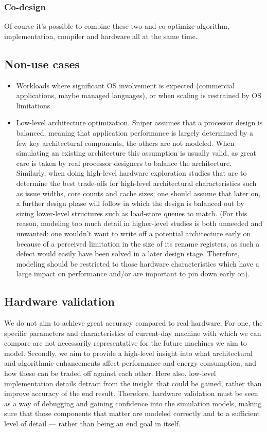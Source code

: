 \documentclass[a4paper,11pt,titlepage]{article}
\begin{document}
{\subsubsection{Co-design}

Of course it's possible to combine these two and co-optimize algorithm, implementation, compiler and hardware all at the same time.


\subsection{Non-use cases}

\begin{itemize}
\item Workloads where significant OS involvement is expected (commercial applications,
      maybe managed languages), or when scaling is restrained by OS limitations
\item Low-level architecture optimization. Sniper assumes that a processor design is balanced, meaning that application performance is largely determined by a few key architectural components, the others are not modeled. When simulating an existing architecture this assumption is usually valid, as great care is taken by real processor designers to balance the architecture. Similarly, when doing high-level hardware exploration studies that are to determine the best trade-offs for high-level architectural characteristics such as issue widths, core counts and cache sizes; one should assume that later on, a further design phase will follow in which the design is balanced out by sizing lower-level structures such as load-store queues to match. (For this reason, modeling too much detail in higher-level studies is both unneeded and unwanted: one wouldn't want to write off a potential architecture early on because of a perceived limitation in the size of its rename registers, as such a defect would easily have been solved in a later design stage. Therefore, modeling should be restricted to those hardware characteristics which have a large impact on performance and/or are important to pin down early on).
\end{itemize}



\subsection{Hardware validation}

We do not aim to achieve great accuracy compared to real hardware. For
one, the specific parameters and characteristics of current-day
machine with which we can compare are not necessarily representative
for the future machines we aim to model. Secondly, we aim to provide a
high-level insight into what architectural and algorithmic
enhancements affect performance and energy consumption, and how these
can be traded off against each other. Here also, low-level
implementation details detract from the insight that could be gained,
rather than improve accuracy of the end result. Therefore, hardware
validation must be seen as a way of debugging and gaining confidence
into the simulation models, making sure that those components that
matter are modeled correctly and to a sufficient level of detail ---
rather than being an end goal in itself.
}
\end{document}
